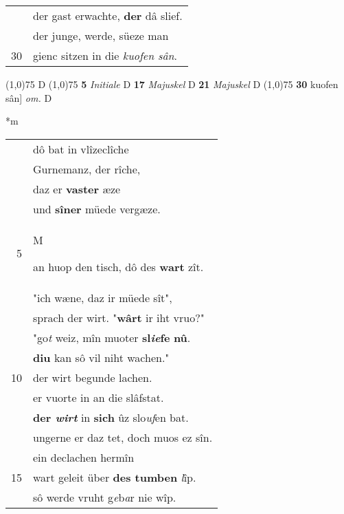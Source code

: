 \documentclass[8pt,a4paper,notitlepage]{article}
\begin{document}
\begin{table}[ht]
\begin{minipage}[t]{0.5\linewidth}
\begin{tabular}{rl}
 & der gast erwachte, \textbf{der} dâ slief.\\ 
 & der junge, werde, süeze man\\ 
30 & gienc sitzen in die \textit{kuofen sân}.\\ 
\end{tabular}
\scriptsize
\line(1,0){75} \newline
D \newline
\line(1,0){75} \newline
\textbf{5} \textit{Initiale} D  \textbf{17} \textit{Majuskel} D  \textbf{21} \textit{Majuskel} D  \newline
\line(1,0){75} \newline
\textbf{30} kuofen sân] \textit{om.} D \newline
\end{minipage}
\hspace{0.5cm}
\begin{minipage}[t]{0.5\linewidth}
\small
\begin{center}*m
\end{center}
\begin{tabular}{rl}
 & dô bat in vlîzeclîche\\ 
 & Gurnemanz, der rîche,\\ 
 & daz er \textbf{vaster} æze\\ 
 & und \textbf{sîner} müede vergæze.\\ 
5 & \begin{large}M\end{large}an huop den tisch, dô des \textbf{wart} zît.\\ 
 & "ich wæne, daz ir müede sît",\\ 
 & sprach der wirt. "\textbf{wârt} ir iht vruo?"\\ 
 & "go\textit{t} weiz, mîn muoter \textbf{sl\textit{ie}fe} \textbf{nû}.\\ 
 & \textbf{diu} kan sô vil niht wachen."\\ 
10 & der wirt begunde lachen.\\ 
 & er vuorte in an die slâfstat.\\ 
 & \textbf{der \textit{wirt}} in \textbf{sich} ûz slo\textit{uf}en bat.\\ 
 & ungerne er daz tet, doch muos ez sîn.\\ 
 & ein declachen hermîn\\ 
15 & wart geleit über \textbf{des tumben} \textit{l}îp.\\ 
 & sô werde vruht g\textit{e}b\textit{a}r nie wîp.\\ 

\end{tabular}
\end{minipage}
\end{table}
\end{document}

